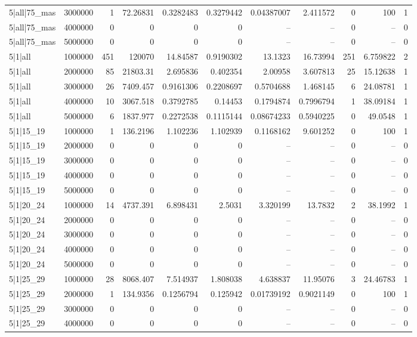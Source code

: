 \begin{tabular}{lrrrrrrrrrr}
5|all|75\_mas & 3000000 & 1 & 72.26831 & 0.3282483 & 0.3279442 & 0.04387007 & 2.411572 & 0 & 100 & 1 \\
5|all|75\_mas & 4000000 & 0 & 0 & 0 & 0 & -- & -- & 0 & -- & 0 \\
5|all|75\_mas & 5000000 & 0 & 0 & 0 & 0 & -- & -- & 0 & -- & 0 \\
5|1|all & 1000000 & 451 & 120070 & 14.84587 & 0.9190302 & 13.1323 & 16.73994 & 251 & 6.759822 & 2 \\
5|1|all & 2000000 & 85 & 21803.31 & 2.695836 & 0.402354 & 2.00958 & 3.607813 & 25 & 15.12638 & 1 \\
5|1|all & 3000000 & 26 & 7409.457 & 0.9161306 & 0.2208697 & 0.5704688 & 1.468145 & 6 & 24.08781 & 1 \\
5|1|all & 4000000 & 10 & 3067.518 & 0.3792785 & 0.14453 & 0.1794874 & 0.7996794 & 1 & 38.09184 & 1 \\
5|1|all & 5000000 & 6 & 1837.977 & 0.2272538 & 0.1115144 & 0.08674233 & 0.5940225 & 0 & 49.0548 & 1 \\
5|1|15\_19 & 1000000 & 1 & 136.2196 & 1.102236 & 1.102939 & 0.1168162 & 9.601252 & 0 & 100 & 1 \\
5|1|15\_19 & 2000000 & 0 & 0 & 0 & 0 & -- & -- & 0 & -- & 0 \\
5|1|15\_19 & 3000000 & 0 & 0 & 0 & 0 & -- & -- & 0 & -- & 0 \\
5|1|15\_19 & 4000000 & 0 & 0 & 0 & 0 & -- & -- & 0 & -- & 0 \\
5|1|15\_19 & 5000000 & 0 & 0 & 0 & 0 & -- & -- & 0 & -- & 0 \\
5|1|20\_24 & 1000000 & 14 & 4737.391 & 6.898431 & 2.5031 & 3.320199 & 13.7832 & 2 & 38.1992 & 1 \\
5|1|20\_24 & 2000000 & 0 & 0 & 0 & 0 & -- & -- & 0 & -- & 0 \\
5|1|20\_24 & 3000000 & 0 & 0 & 0 & 0 & -- & -- & 0 & -- & 0 \\
5|1|20\_24 & 4000000 & 0 & 0 & 0 & 0 & -- & -- & 0 & -- & 0 \\
5|1|20\_24 & 5000000 & 0 & 0 & 0 & 0 & -- & -- & 0 & -- & 0 \\
5|1|25\_29 & 1000000 & 28 & 8068.407 & 7.514937 & 1.808038 & 4.638837 & 11.95076 & 3 & 24.46783 & 1 \\
5|1|25\_29 & 2000000 & 1 & 134.9356 & 0.1256794 & 0.125942 & 0.01739192 & 0.9021149 & 0 & 100 & 1 \\
5|1|25\_29 & 3000000 & 0 & 0 & 0 & 0 & -- & -- & 0 & -- & 0 \\
5|1|25\_29 & 4000000 & 0 & 0 & 0 & 0 & -- & -- & 0 & -- & 0 \\

\end{tabular}
